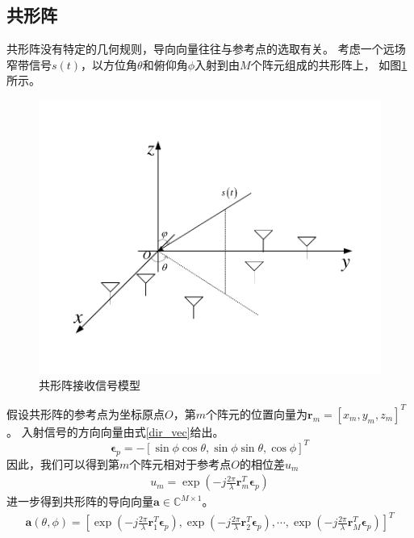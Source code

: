 \documentclass[master]{thesis-uestc}
\begin{document}
\subsection{共形阵}
共形阵没有特定的几何规则，导向向量往往与参考点的选取有关。
考虑一个远场窄带信号$s(t)$，以方位角$\theta$和俯仰角$\phi$入射到由$M$个阵元组成的共形阵上，
如图\ref{conformal_array}所示。
\begin{figure}[h]
\includegraphics[scale=0.8]{pic/conformal_array.pdf}
\caption{共形阵接收信号模型}
\label{conformal_array}
\end{figure}
假设共形阵的参考点为坐标原点$O$，第$m$个阵元的位置向量为$\bm{r}_m=\left[x_m,y_m,z_m\right]^T$。
入射信号的方向向量由式\eqref{dir_vec}给出。
\begin{equation}\label{dir_vec}
    \bm{\epsilon}_p=-\left[\sin\phi\cos\theta,
                                   \sin\phi\sin\theta,
                                   \cos\phi\right]^T
\end{equation}
因此，我们可以得到第$m$个阵元相对于参考点$O$的相位差$u_m$
\begin{equation}\label{delay}
    \begin{aligned}
        u_m = \exp\left(-j\frac{2\pi}{\lambda}\bm{r}_m^T\bm{\epsilon}_p\right)
    \end{aligned}
\end{equation}
进一步得到共形阵的导向向量$\bm{a}\in\mathbb{C}^{M\times1}$。
\begin{equation}\label{sv}
    \begin{aligned}
        \bm{a}\left(\theta,\phi\right) = 
        \left[\exp\left(-j\frac{2\pi}{\lambda}\bm{r}_1^T\bm{\epsilon}_p\right),
              \exp\left(-j\frac{2\pi}{\lambda}\bm{r}_2^T\bm{\epsilon}_p\right),
              \cdots,
              \exp\left(-j\frac{2\pi}{\lambda}\bm{r}_M^T\bm{\epsilon}_p\right)\right]^T
    \end{aligned}
\end{equation}
\end{document}
